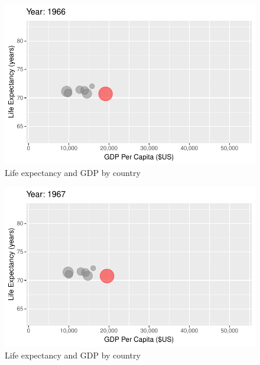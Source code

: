 \documentclass[
  letterpaper,
  DIV=11,
  numbers=noendperiod]{scrreport}
\theoremstyle{definition}
\theoremstyle{remark}
\begin{document}
\begin{figure}

{\centering \includegraphics{index_files/figure-pdf/fig-anim-country-27.pdf}

}

\caption{\label{fig-anim-country-27}Life expectancy and GDP by country}

\end{figure}

\begin{figure}

{\centering \includegraphics{index_files/figure-pdf/fig-anim-country-28.pdf}

}

\caption{\label{fig-anim-country-28}Life expectancy and GDP by country}

\end{figure}
\end{document}
